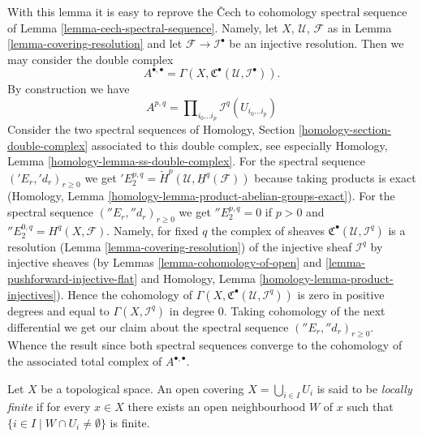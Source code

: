 \noindent
With this lemma it is easy to reprove the {\v C}ech to cohomology spectral
sequence of Lemma \ref{lemma-cech-spectral-sequence}. Namely,
let $X$, $\mathcal{U}$, $\mathcal{F}$ as in
Lemma \ref{lemma-covering-resolution}
and let $\mathcal{F} \to \mathcal{I}^\bullet$ be an injective resolution.
Then we may consider the double complex
$$
A^{\bullet, \bullet} =
\Gamma(X, {\mathfrak C}^\bullet(\mathcal{U}, \mathcal{I}^\bullet)).
$$
By construction we have
$$
A^{p, q} = \prod\nolimits_{i_0 \ldots i_p} \mathcal{I}^q(U_{i_0 \ldots i_p})
$$
Consider the two spectral sequences of
Homology, Section \ref{homology-section-double-complex} associated
to this double complex, see especially
Homology, Lemma \ref{homology-lemma-ss-double-complex}.
For the spectral sequence $({}'E_r, {}'d_r)_{r \geq 0}$ we get
${}'E_2^{p, q} = \check{H}^p(\mathcal{U}, \underline{H}^q(\mathcal{F}))$
because taking products is exact
(Homology, Lemma \ref{homology-lemma-product-abelian-groups-exact}).
For the spectral sequence $({}''E_r, {}''d_r)_{r \geq 0}$ we get
${}''E_2^{p, q} = 0$ if $p > 0$ and ${}''E_2^{0, q} = H^q(X, \mathcal{F})$.
Namely, for fixed $q$ the complex of sheaves
${\mathfrak C}^\bullet(\mathcal{U}, \mathcal{I}^q)$
is a resolution (Lemma \ref{lemma-covering-resolution})
of the injective sheaf $\mathcal{I}^q$
by injective sheaves (by Lemmas \ref{lemma-cohomology-of-open} and
\ref{lemma-pushforward-injective-flat}
and
Homology, Lemma \ref{homology-lemma-product-injectives}).
Hence the cohomology of
$\Gamma(X, {\mathfrak C}^\bullet(\mathcal{U}, \mathcal{I}^q))$
is zero in positive degrees and equal to $\Gamma(X, \mathcal{I}^q)$
in degree $0$. Taking cohomology of the next differential
we get our claim about the spectral sequence $({}''E_r, {}''d_r)_{r \geq 0}$.
Whence the result since both spectral sequences converge to the
cohomology of the associated total complex of $A^{\bullet, \bullet}$.

\begin{definition}
\label{definition-covering-locally-finite}
Let $X$ be a topological space.
An open covering $X = \bigcup_{i \in I} U_i$ is said to be
{\it locally finite} if for every $x \in X$ there exists an open neighbourhood
$W$ of $x$ such that $\{i \in I \mid W \cap U_i \not = \emptyset\}$ is finite.
\end{definition}

